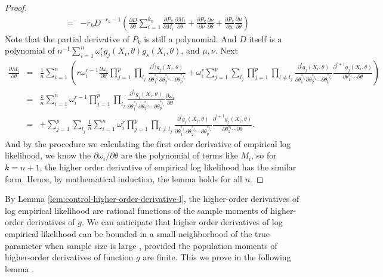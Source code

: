 \begin{proof}
\begin{eqnarray*}
&= &-r_{k}D^{-r_{k}-1}\left(\frac{\partial D}{\partial\theta}\sum_{i=1}^{k_{n}}\frac{\partial P_{k}}{\partial M_{i}}\frac{\partial M_{i}}{\partial\theta}+\frac{\partial P_{k}}{\partial\nu}\frac{\partial\nu}{\partial\theta}+\frac{\partial P_{k}}{\partial\mu}\frac{\partial\mu}{\partial\theta}\right)
\end{eqnarray*}
Note that the partial derivative of $P_{k}$ is still a polynomial.
And $D$ itself is a polynomial of $n^{-1}\sum_{i=1}^{n}\omega_{i}^{r}g_{j}\left(X_{i},\theta\right)g_{s}\left(X_{i},\theta\right)$,
and $\mu,\nu$. Next 
\begin{eqnarray*}
\frac{\partial M_{i}}{\partial\theta} & = & \frac{1}{n}\sum_{i=1}^{n}\left(r\omega_{i}^{r-1}\frac{\partial\omega_{i}}{\partial\theta}\prod_{j=1}^{p}\prod_{l_{j}}\frac{\partial^{l_{j}}g_{j}\left(X_{i},\theta\right)}{\partial\theta_{1}^{s_{j_{1}}}\partial\theta_{2}^{s_{j_{2}}}\cdots\partial\theta_{p}^{s_{j_{p}}}}+\omega_{i}^{r}\sum_{j=1}^{p}\sum_{l_{j}}\prod_{j=1}^{p}\prod_{l\neq l_{j}}\frac{\partial^{l}g_{j}\left(X_{i},\theta\right)}{\partial\theta_{1}^{s_{j_{1}}}\partial\theta_{2}^{s_{j_{2}}}\cdots\partial\theta_{p}^{s_{j_{p}}}}\frac{\partial^{l+1}g_{j}\left(X_{i},\theta\right)}{\partial\theta_{1}^{s_{1}}\cdots\partial\theta}\right)\\
 & = & \frac{r}{n}\sum_{i=1}^{n}\omega_{i}^{r-1}\prod_{j=1}^{p}\prod_{l_{j}}\frac{\partial^{l_{j}}g_{j}\left(X_{i},\theta\right)}{\partial\theta_{1}^{s_{j_{1}}}\partial\theta_{2}^{s_{j_{2}}}\cdots\partial\theta_{p}^{s_{j_{p}}}}\frac{\partial\omega_{i}}{\partial\theta} \\
 &=& +\sum_{j=1}^{p}\sum_{l_{j}}\frac{1}{n}\sum_{i=1}^{n}\omega_{i}^{r}\prod_{j=1}^{p}\prod_{l\neq l_{j}}\frac{\partial^{l}g_{j}\left(X_{i},\theta\right)}{\partial\theta_{1}^{s_{j_{1}}}\partial\theta_{2}^{s_{j_{2}}}\cdots\partial\theta_{p}^{s_{j_{p}}}}\frac{\partial^{l+1}g_{j}\left(X_{i},\theta\right)}{\partial\theta_{1}^{s_{1}}\cdots\partial\theta}.
\end{eqnarray*}
And by the procedure we calculating the first order derivative of
empirical log likelihood, we know the $\partial\omega_{i}/\partial\theta$
are the polynomial of terms like $M_{i}$, so for $k=n+1$, the higher
order derivative of empirical log likelihood has the similar form.
Hence, by mathematical induction, the lemma holds for all $n$. 
\end{proof}
By Lemma \ref{lem:control-higher-order-derivative-l}, the higher-order derivatives of log empirical likelihood are rational functions of the sample moments of higher-order derivatives of  $g$. We can anticipate
that higher order derivatives of log empirical likelihood can be bounded
in a small neighborhood of the true parameter when sample size is
large , provided the population moments of higher-order derivatives of function $g$ are finite. This we prove in the following lemma .


